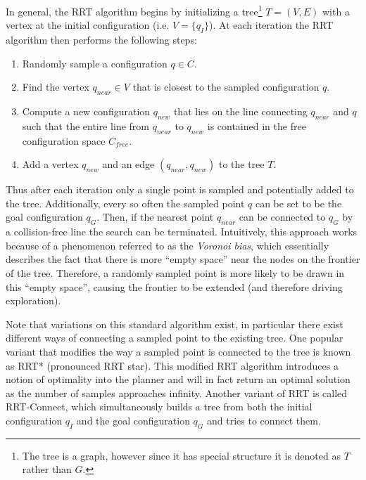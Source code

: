 In general, the RRT algorithm begins by initializing a tree\footnote{The tree is a graph, however since it has special structure it is denoted as $T$ rather than $G$.} $T = (V,E)$ with a vertex at the initial configuration (i.e. $V = \{q_I\}$). At each iteration the RRT algorithm then performs the following steps:
\begin{enumerate}
    \item Randomly sample a configuration $q \in C$.
    \item Find the vertex $q_{near} \in V$ that is closest to the sampled configuration $q$.
    \item Compute a new configuration $q_{new}$ that lies on the line connecting $q_{near}$ and $q$ such that the entire line from $q_{near}$ to $q_{new}$ is contained in the free configuration space $C_{free}$.
    \item Add a vertex $q_{new}$ and an edge $(q_{near}, q_{new})$  to the tree $T$.
\end{enumerate}
Thus after each iteration only a single point is sampled and potentially added to the tree. Additionally, every so often the sampled point $q$ can be set to be the goal configuration $q_G$. Then, if the nearest point $q_{near}$ can be connected to $q_G$ by a collision-free line the search can be terminated. Intuitively, this approach works because of a phenomenon referred to as the \textit{Voronoi bias}, which essentially describes the fact that there is more ``empty space'' near the nodes on the frontier of the tree. Therefore, a randomly sampled point is more likely to be drawn in this ``empty space'', causing the frontier to be extended (and therefore driving exploration).

Note that variations on this standard algorithm exist, in particular there exist different ways of connecting a sampled point to the existing tree. One popular variant that modifies the way a sampled point is connected to the tree is known as RRT* (pronounced RRT star). This modified RRT algorithm introduces a notion of optimality into the planner and will in fact return an optimal solution as the number of samples approaches infinity. Another variant of RRT is called RRT-Connect, which simultaneously builds a tree from both the initial configuration $q_I$ and the goal configuration $q_G$ and tries to connect them.

